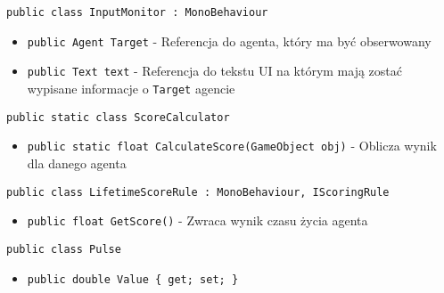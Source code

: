\documentclass[12pt,a4paper]{article}
\begin{document}
\lstinline{public class InputMonitor : MonoBehaviour}
\begin{itemize}
    \item \lstinline|public Agent Target| - Referencja do agenta, który ma być obserwowany
    \item \lstinline|public Text text| - Referencja do tekstu UI na którym mają zostać wypisane informacje o \lstinline{Target} agencie
\end{itemize}


\lstinline{public static class ScoreCalculator}
\begin{itemize}
    \item \lstinline|public static float CalculateScore(GameObject obj)| - Oblicza wynik dla danego agenta
\end{itemize}


\lstinline{public class LifetimeScoreRule : MonoBehaviour, IScoringRule}
\begin{itemize}
    \item \lstinline|public float GetScore()| - Zwraca wynik czasu życia agenta
\end{itemize}


\lstinline{public class Pulse}
\begin{itemize}
    \item \lstinline|public double Value { get; set; }|
\end{itemize}
\end{document}
